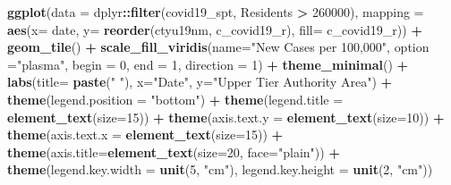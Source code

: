 \documentclass[
]{book}
\newenvironment{Shaded}{\begin{snugshade}}{\end{snugshade}}
\newcommand{\DataTypeTok}[1]{\textcolor[rgb]{0.13,0.29,0.53}{#1}}
\newcommand{\DecValTok}[1]{\textcolor[rgb]{0.00,0.00,0.81}{#1}}
\newcommand{\KeywordTok}[1]{\textcolor[rgb]{0.13,0.29,0.53}{\textbf{#1}}}
\newcommand{\NormalTok}[1]{#1}
\newcommand{\OperatorTok}[1]{\textcolor[rgb]{0.81,0.36,0.00}{\textbf{#1}}}
\newcommand{\StringTok}[1]{\textcolor[rgb]{0.31,0.60,0.02}{#1}}
\begin{document}
\begin{Shaded}
\begin{Highlighting}[]
\KeywordTok{ggplot}\NormalTok{(}\DataTypeTok{data =}\NormalTok{ dplyr}\OperatorTok{::}\KeywordTok{filter}\NormalTok{(covid19_spt, Residents }\OperatorTok{>}\StringTok{ }\DecValTok{260000}\NormalTok{), }
           \DataTypeTok{mapping =} \KeywordTok{aes}\NormalTok{(}\DataTypeTok{x=}\NormalTok{ date, }\DataTypeTok{y=} \KeywordTok{reorder}\NormalTok{(ctyu19nm, c_covid19_r), }\DataTypeTok{fill=}\NormalTok{ c_covid19_r)) }\OperatorTok{+}
\StringTok{  }\KeywordTok{geom_tile}\NormalTok{() }\OperatorTok{+}
\StringTok{  }\KeywordTok{scale_fill_viridis}\NormalTok{(}\DataTypeTok{name=}\StringTok{"New Cases per 100,000"}\NormalTok{, }\DataTypeTok{option =}\StringTok{"plasma"}\NormalTok{, }\DataTypeTok{begin =} \DecValTok{0}\NormalTok{, }\DataTypeTok{end =} \DecValTok{1}\NormalTok{, }\DataTypeTok{direction =} \DecValTok{1}\NormalTok{) }\OperatorTok{+}
\StringTok{  }\KeywordTok{theme_minimal}\NormalTok{() }\OperatorTok{+}\StringTok{ }
\StringTok{  }\KeywordTok{labs}\NormalTok{(}\DataTypeTok{title=} \KeywordTok{paste}\NormalTok{(}\StringTok{" "}\NormalTok{), }\DataTypeTok{x=}\StringTok{"Date"}\NormalTok{, }\DataTypeTok{y=}\StringTok{"Upper Tier Authority Area"}\NormalTok{) }\OperatorTok{+}
\StringTok{  }\KeywordTok{theme}\NormalTok{(}\DataTypeTok{legend.position =} \StringTok{"bottom"}\NormalTok{) }\OperatorTok{+}
\StringTok{  }\KeywordTok{theme}\NormalTok{(}\DataTypeTok{legend.title =} \KeywordTok{element_text}\NormalTok{(}\DataTypeTok{size=}\DecValTok{15}\NormalTok{)) }\OperatorTok{+}
\StringTok{  }\KeywordTok{theme}\NormalTok{(}\DataTypeTok{axis.text.y =} \KeywordTok{element_text}\NormalTok{(}\DataTypeTok{size=}\DecValTok{10}\NormalTok{)) }\OperatorTok{+}
\StringTok{  }\KeywordTok{theme}\NormalTok{(}\DataTypeTok{axis.text.x =} \KeywordTok{element_text}\NormalTok{(}\DataTypeTok{size=}\DecValTok{15}\NormalTok{)) }\OperatorTok{+}
\StringTok{  }\KeywordTok{theme}\NormalTok{(}\DataTypeTok{axis.title=}\KeywordTok{element_text}\NormalTok{(}\DataTypeTok{size=}\DecValTok{20}\NormalTok{, }\DataTypeTok{face=}\StringTok{"plain"}\NormalTok{)) }\OperatorTok{+}
\StringTok{  }\KeywordTok{theme}\NormalTok{(}\DataTypeTok{legend.key.width =} \KeywordTok{unit}\NormalTok{(}\DecValTok{5}\NormalTok{, }\StringTok{"cm"}\NormalTok{), }\DataTypeTok{legend.key.height =} \KeywordTok{unit}\NormalTok{(}\DecValTok{2}\NormalTok{, }\StringTok{"cm"}\NormalTok{))}
\end{Highlighting}
\end{Shaded}
\end{document}

